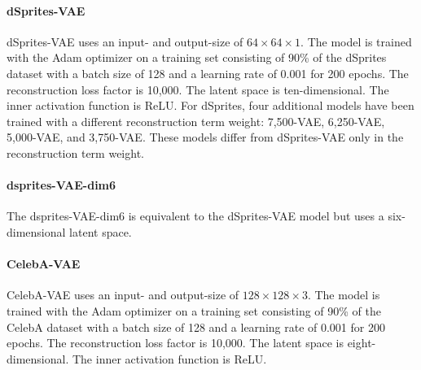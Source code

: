 \paragraph{dSprites-\ac{VAE}} dSprites-\ac{VAE} uses an input- and output-size of $64\times 64\times 1$.
The model is trained with the Adam optimizer on a training set consisting of 90\% of the dSprites dataset with a batch size of 128 and a learning rate of 0.001 for 200 epochs.
The reconstruction loss factor is 10,000.
The latent space is ten-dimensional.
The inner activation function is ReLU.
For dSprites, four additional models have been trained with a different reconstruction term weight: 7,500-\ac{VAE}, 6,250-\ac{VAE}, 5,000-\ac{VAE}, and 3,750-\ac{VAE}.
These models differ from dSprites-\ac{VAE} only in the reconstruction term weight.

\paragraph{dsprites-VAE-dim6}
The dsprites-\ac{VAE}-dim6 is equivalent to the dSprites-\ac{VAE} model but uses a six-dimensional latent space.

\paragraph{CelebA-VAE} CelebA-\ac{VAE} uses an input- and output-size of $128\times 128\times 3$.
The model is trained with the Adam optimizer on a training set consisting of 90\% of the CelebA dataset with a batch size of 128 and a learning rate of 0.001 for 200 epochs.
The reconstruction loss factor is 10,000.
The latent space is eight-dimensional.
The inner activation function is ReLU.

